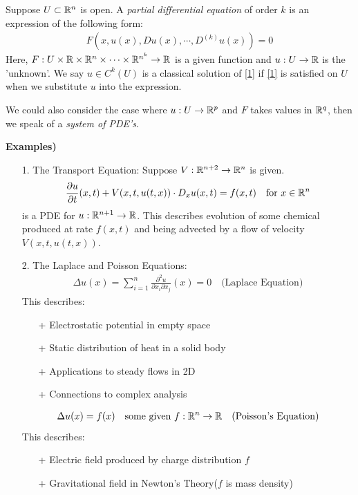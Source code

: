 \documentclass[10pt,a4paper]{report}
\begin{document}
Suppose $U \subset \mathbb{R}^n$ is open. A \emph{partial differential equation} of order $k$ is an expression of the following form:
\begin{align}
F(x, u(x),Du(x),\cdots,D^{(k)}u(x))=0 \label{1}
\end{align}
Here, $F: U \times \mathbb{R}\times \mathbb{R}^n \times \cdots \times \mathbb{R}^{n^k} \rightarrow \mathbb{R}$ is a given function and $u : U \rightarrow \mathbb{R}$ is the 'unknown'. We say $u\in C^k(U)$ is a classical solution of \ref{1} if \ref{1} is satisfied on $U$ when we substitute $u$ into the expression.
\s

We could also consider the case where $u:U \rightarrow \mathbb{R}^p$ and $F$ takes values in $\mathbb{R}^q$, then we speak of a \emph{system of PDE's}.
\s

\textbf{Examples)}
\begin{itemize}
\item[1.] The Transport Equation:
Suppose $V :\mathbb{R}^{n+2} \rightarrow \mathbb{R}^n$ is given.
\begin{align*}
\frac{\partial u}{\partial t}(x,t) + V(x,t,u(t,x)) \cdot D_x u (x,t) = f(x,t) \quad \text{for } x\in \mathbb{R}^n
\end{align*}
is a PDE for $u: \mathbb{R}^{n+1} \rightarrow \mathbb{R}$. This describes evolution of some chemical produced at rate $f(x,t)$ and being advected by a flow of velocity $V(x,t,u(t,x))$.

\item[2.] The Laplace and Poisson Equations:
\begin{align*}
\Delta u(x) = \sum_{i=1}^n \frac{\partial^2 u}{\partial x_i \partial x_j}(x)=0 \quad \text{(Laplace Equation)}
\end{align*}
This describes: \begin{itemize}
\item[+] Electrostatic potential in empty space
\item[+] Static distribution of heat in a solid body
\item[+] Applications to steady flows in 2D
\item[+] Connections to complex analysis
\end{itemize}

\begin{align*}
\Delta u(x) =f(x) \quad \text{some given } f: \mathbb{R}^n \rightarrow \mathbb{R} \quad \text{(Poisson's Equation)}
\end{align*}
This describes: \begin{itemize}
\item[+] Electric field produced by charge distribution $f$
\item[+] Gravitational field in Newton's Theory($f$ is mass density)
\end{itemize}


\end{itemize}
\end{document}
